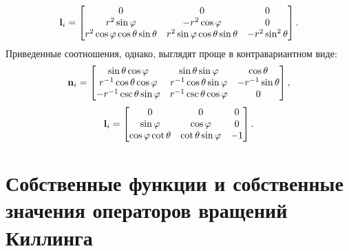 \documentclass[12pt,a4paper]{article}
\begin{document}
        \begin{equation}
            \mathbf{l}_i
            =
            \begin{bmatrix}
                0
                    & 0
                    & 0 \\
                r^2 \sin\varphi
                    & - r^2 \cos\varphi
                    & 0 \\
                r^2 \cos\varphi \cos\theta \sin\theta
                    & r^2 \sin\varphi \cos\theta \sin\theta
                    & - r^2 \sin^2\theta
            \end{bmatrix}
            .
        \end{equation}
        Приведенные соотношения, однако, выглядят проще в контравариантном виде:
        \begin{equation}
            \mathbf{n}_i
            =
            \begin{bmatrix}
                \sin\theta \cos\varphi          & \sin\theta \sin\varphi        & \cos\theta \\
                r^{-1} \cos\theta \cos\varphi   & r^{-1} \cos\theta \sin\varphi & - r^{-1} \sin\theta \\
                - r^{-1} \csc\theta \sin\varphi & r^{-1} \csc\theta \cos\varphi & 0
            \end{bmatrix}
            ,
        \end{equation}
        \begin{equation}
            \mathbf{l}_i
            =
            \begin{bmatrix}
                0
                    & 0
                    & 0 \\
                \sin\varphi
                    & \cos\varphi
                    & 0 \\
                \cos\varphi \cot\theta
                    & \cot\theta \sin\varphi
                    & - 1
            \end{bmatrix}
            .
        \end{equation}


    \section{Собственные функции и собственные значения операторов вращений Киллинга}
\end{document}
